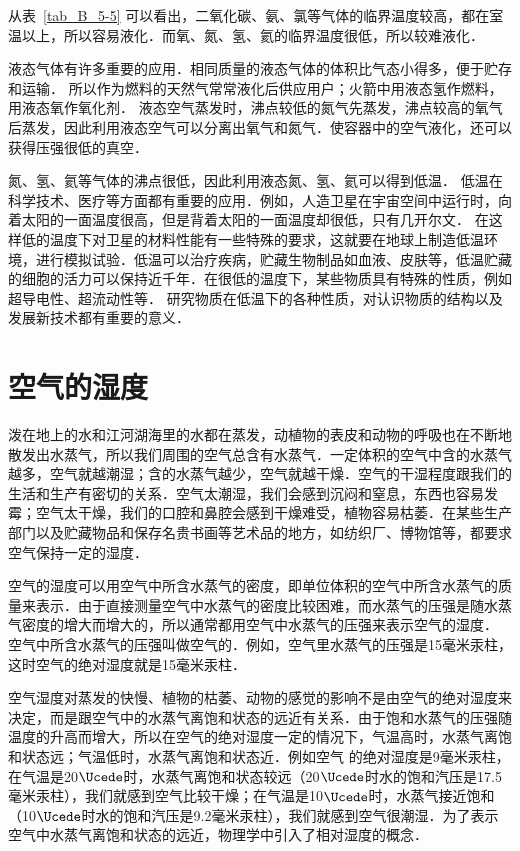 从表~\ref{tab_B_5-5} 可以看出，二氧化碳、氨、氯等气体的临界温度较高，都在室温以上，所以容易液化．而氧、氮、氢、氦的临界温度很低，所以较难液化．

液态气体有许多重要的应用．相同质量的液态气体的体积比气态小得多，便于贮存和运输．
所以作为燃料的天然气常常液化后供应用户；火箭中用液态氢作燃料，用液态氧作氧化剂．
液态空气蒸发时，沸点较低的氮气先蒸发，沸点较高的氧气后蒸发，因此利用液态空气可以分离出氧气和氮气．使容器中的空气液化，还可以获得压强很低的真空．

氮、氢、氦等气体的沸点很低，因此利用液态氮、氢、氦可以得到低温．
低温在科学技术、医疗等方面都有重要的应用．例如，人造卫星在宇宙空间中运行时，向着太阳的一面温度很高，但是背着太阳的一面温度却很低，只有几开尔文．
在这样低的温度下对卫星的材料性能有一些特殊的要求，这就要在地球上制造低温环境，进行模拟试验．低温可以治疗疾病，贮藏生物制品如血液、皮肤等，低温贮藏的细胞的活力可以保持近千年．在很低的温度下，某些物质具有特殊的性质，例如超导电性、超流动性等．
研究物质在低温下的各种性质，对认识物质的结构以及发展新技术都有重要的意义．

\section{空气的湿度}
泼在地上的水和江河湖海里的水都在蒸发，动植物的表皮和动物的呼吸也在不断地散发出水蒸气，所以我们周围的空气总含有水蒸气．一定体积的空气中含的水蒸气越多，空气就越潮湿；含的水蒸气越少，空气就越干燥．空气的干湿程度跟我们的生活和生产有密切的关系．空气太潮湿，我们会感到沉闷和窒息，东西也容易发霉；空气太干燥，我们的口腔和鼻腔会感到干燥难受，植物容易枯萎．在某些生产部门以及贮藏物品和保存名贵书画等艺术品的地方，如纺织厂、博物馆等，都要求空气保持一定的湿度．

空气的湿度可以用空气中所含水蒸气的密度，即单位体积的空气中所含水蒸气的质量来表示．由于直接测量空气中水蒸气的密度比较困难，而水蒸气的压强是随水蒸气密度的增大而增大的，所以通常都用空气中水蒸气的压强来表示空气的湿度．
空气中所含水蒸气的压强叫做空气的．例如，空气里水蒸气的压强是15毫米汞柱，这时空气的绝对湿度就是15毫米汞柱．

空气湿度对蒸发的快慢、植物的枯萎、动物的感觉的影响不是由空气的绝对湿度来决定，而是跟空气中的水蒸气离饱和状态的远近有关系．由于饱和水蒸气的压强随温度的升高而增大，所以在空气的绝对湿度一定的情况下，气温高时，水蒸气离饱和状态远；气温低时，水蒸气离饱和状态近．例如空气
的绝对湿度是9毫米汞柱，在气温是20$\Ucede$时，水蒸气离饱和状态较远（20$\Ucede$时水的饱和汽压是17.5毫米汞柱），我们就感到空气比较干燥；在气温是10$\Ucede$时，水蒸气接近饱和（10$\Ucede$时水的饱和汽压是9.2毫米汞柱），我们就感到空气很潮湿．为了表示空气中水蒸气离饱和状态的远近，物理学中引入了相对湿度的概念．

